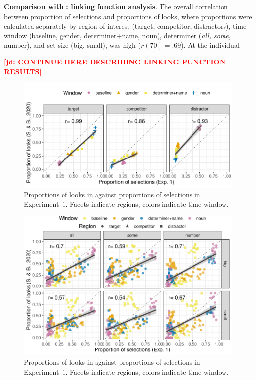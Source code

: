 \documentclass[10pt,letterpaper]{article}
\newcommand{\expref}[1]{Experiment~#1}
\newcommand{\jd}[1]{\textcolor{Red}{\textbf{[jd: #1]}}}
\begin{document}
\textbf{Comparison with : linking function analysis}. The overall correlation between proportion of selections and proportions of looks, where proportions were calculated separately by region of interest (target, competitor, distractors), time window (baseline, gender, determiner$+$name, noun), determiner (\emph{all, some}, number), and set size (big, small), was high ($r(70) = .69$). At the individual


\jd{CONTINUE HERE DESCRIBING LINKING FUNCTION RESULTS}

\begin{figure}[H]
\centering
\includegraphics[width=\columnwidth]{../../analysis/SunBreheny/1_incremental/main/graphs/correlations}
\caption{Proportions of looks in  against proportions of selections in \expref{1}. Facets indicate regions, colors indicate time window.} 
\label{fig:results-correlations}
\end{figure}

\begin{figure}[H]
\centering
\includegraphics[width=\columnwidth]{../../analysis/SunBreheny/1_incremental/main/graphs/correlations-bycondition}
\caption{Proportions of looks in  against proportions of selections in \expref{1}. Facets indicate regions, colors indicate time window.} 
\label{fig:results-correlations}
\end{figure}
\end{document}
